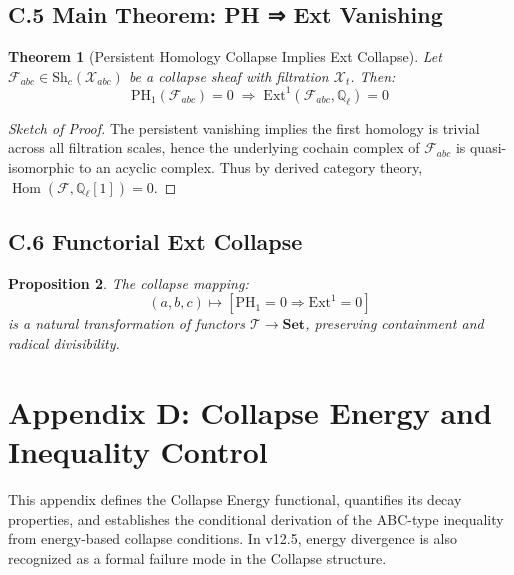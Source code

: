 \documentclass[11pt]{article}
\newtheorem{theorem}{Theorem}[section]
\newtheorem{proposition}[theorem]{Proposition}
\begin{document}
\subsection*{C.5 Main Theorem: PH ⇒ Ext Vanishing}

\begin{theorem}[Persistent Homology Collapse Implies Ext Collapse]
Let \( \mathcal{F}_{abc} \in \mathrm{Sh}_c(\mathcal{X}_{abc}) \) be a collapse sheaf with filtration \( \mathcal{X}_t \).  
Then:
\[
\mathrm{PH}_1(\mathcal{F}_{abc}) = 0 \;\Rightarrow\; \mathrm{Ext}^1(\mathcal{F}_{abc}, \mathbb{Q}_\ell) = 0
\]
\end{theorem}

\begin{proof}[Sketch of Proof]
The persistent vanishing implies the first homology is trivial across all filtration scales, hence  
the underlying cochain complex of \( \mathcal{F}_{abc} \) is quasi-isomorphic to an acyclic complex.  
Thus by derived category theory, \( \operatorname{Hom}(\mathcal{F}, \mathbb{Q}_\ell[1]) = 0 \).
\end{proof}

\subsection*{C.6 Functorial Ext Collapse}

\begin{proposition}
The collapse mapping:
\[
(a,b,c) \mapsto \left[ \mathrm{PH}_1 = 0 \Rightarrow \mathrm{Ext}^1 = 0 \right]
\]
is a natural transformation of functors \( \mathcal{T} \to \mathbf{Set} \), preserving containment and radical divisibility.
\end{proposition}


\section*{Appendix D: Collapse Energy and Inequality Control}

This appendix defines the Collapse Energy functional, quantifies its decay properties,  
and establishes the conditional derivation of the ABC-type inequality from energy-based collapse conditions.  
In v12.5, energy divergence is also recognized as a formal failure mode in the Collapse structure.
\end{document}
